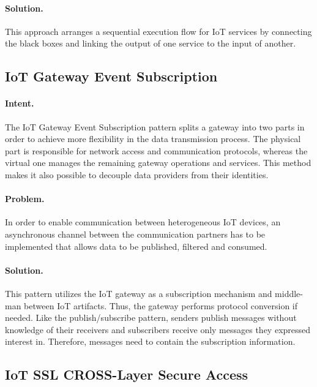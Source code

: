 \paragraph{\textbf{Solution.}} This approach arranges a sequential execution flow for IoT services by connecting the black boxes and linking the output of one service to the input of another.


\subsection{IoT Gateway Event Subscription~\cite{Tkaczyk2018}} 
\label{p:gateway}

\paragraph{\textbf{Intent.}} The IoT Gateway Event Subscription pattern splits a gateway into two parts in order to achieve more flexibility in the data transmission process. The physical part is responsible for network access and communication protocols, whereas the virtual one manages the remaining gateway operations and services. This method makes it also possible to decouple data providers from their identities.

\paragraph{\textbf{Problem.}} In order to enable communication between heterogeneous IoT devices, an asynchronous channel between the communication partners has to be implemented that allows data to be published, filtered and consumed.

\paragraph{\textbf{Solution.}} This pattern utilizes the IoT gateway as a subscription mechanism and middle-man between IoT artifacts. Thus, the gateway performs protocol conversion if needed. Like the publish/subscribe pattern, senders publish messages without knowledge of their receivers and subscribers receive only messages they expressed interest in. Therefore, messages need to contain the subscription information.


\subsection{IoT SSL CROSS-Layer Secure Access~\cite{Tkaczyk2018}}
\label{p:ssl}

